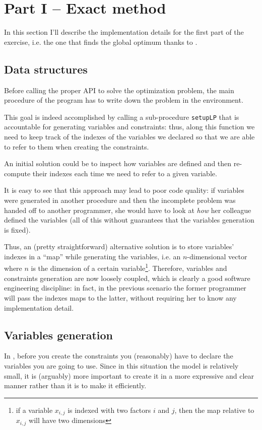 \section{Part I -- Exact method}

In this section I'll describe the implementation details for the first part of
the exercise, i.e. the one that finds the global optimum thanks to \cplex.

\subsection{Data structures}
Before calling the proper API to solve the optimization problem, the main
procedure of the program has to write down the problem in the \cplex{}
environment.

This goal is indeed accomplished by calling a sub-procedure \texttt{setupLP}
that is accountable for generating variables and constraints: thus, along this
function we need to keep track of the indexes of the variables we declared so
that we are able to refer to them when creating the constraints.

An initial solution could be to inspect how variables are defined and then
re-compute their indexes each time we need to refer to a given variable.

It is easy to see that this approach may lead to poor code quality: if variables
were generated in another procedure and then the incomplete problem was handed
off to another programmer, she would have to look at \textit{how} her colleague
defined the variables (all of this without guarantees that the variables
generation is fixed).

Thus, an (pretty straightforward) alternative solution is to store variables'
indexes in a ``map'' while generating the variables, i.e. an $n$-dimensional
vector where $n$ is the dimension of a certain variable\footnote{if a variable
$x_{i,j}$ is indexed with two factors $i$ and $j$, then the map relative to
$x_{i,j}$ will have two dimensions}.
Therefore, variables and constraints generation are now loosely coupled, which
is clearly a good software engineering discipline: in fact, in the previous
scenario the former programmer will pass the indexes maps to the latter, without
requiring her to know any implementation detail.

\subsection{Variables generation}
In \cplex, before you create the constraints you (reasonably) have to declare
the variables you are going to use. Since in this situation the model is
relatively small, it is (arguably) more important to create it in a more
expressive and clear manner rather than it is to make it efficiently.

